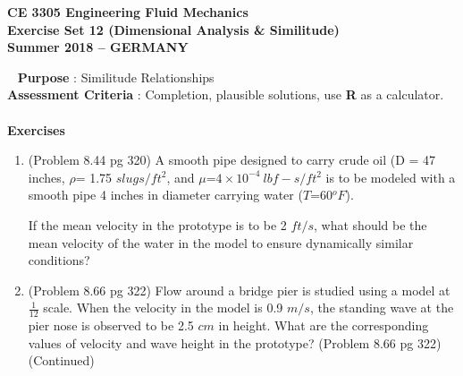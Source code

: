 \documentclass[12pt]{article}
\begin{document}
\begingroup
\begin{center}
{\textbf{{ CE 3305 Engineering Fluid Mechanics} \\ Exercise Set 12 (Dimensional Analysis \& Similitude) \\ Summer 2018 -- GERMANY} }
\end{center}
\endgroup
\begingroup
~\newline
\textbf{Purpose} :  Similitude Relationships \\
\textbf{Assessment Criteria} : Completion, plausible solutions, use \textbf{R} as a calculator. \\~\\
\textbf{Exercises}

\begin{enumerate}
\item (Problem 8.44 pg 320)  A smooth pipe designed to carry crude oil (D = 47 inches, $\rho$= 1.75 $slugs/ft^2$, and $\mu$=$4\times10^{-4}~lbf-s/ft^2$ is to be modeled with a smooth pipe 4 inches in diameter carrying water ($T$=60$^oF$).

If the mean velocity in the prototype is to be 2 $ft/s$, what should be the mean velocity of the water in the model to ensure dynamically similar conditions?

\item (Problem 8.66 pg 322) Flow around a bridge pier is studied using a model at $\frac{1}{12}$ scale.   When the velocity in the model is 0.9 $m/s$, the standing wave at the pier nose is observed to be 2.5 $cm$ in height.  What are the corresponding values of velocity and wave height in the prototype?
\clearpage
(Problem 8.66 pg 322) (Continued)
\end{enumerate}
\end{document}
